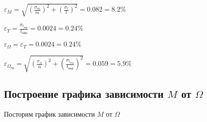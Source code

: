 \documentclass[a4paper]{article}
\begin{document}
\item $\varepsilon_M = \sqrt{(\frac{\sigma_m}{m})^2 + (\frac{\sigma_l}{l})^2} = 0.082 = 8.2 \%$ \\

\item $\varepsilon_T = \frac{\sigma_{t_\text{обр}}}{t_\text{обр}} = 0.0024 = 0.24 \%$ \\

\item $\varepsilon_\Omega = \varepsilon_T = 0.0024 = 0.24 \%$ \\

\item $\varepsilon_{\Omega_\text{тр}} = \sqrt{(\frac{\sigma_\alpha}{\alpha})^2 + (\frac{\sigma_{t_\text{пад}}}{t_\text{пад}})^2} = 0.059 = 5.9 \%$ \\


\subsection{Построение графика зависимости $M$ от $\Omega$}

Посторим график зависимости $M$ от $\Omega$

\newpage
\end{document}

